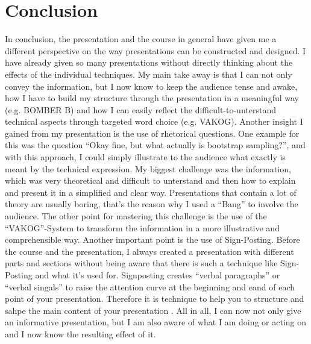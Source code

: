 \chapter{Conclusion}

In conclusion, the presentation and the course in general have given me a different perspective on the way presentations can be constructed and designed. I have already given so many presentations without directly thinking about the effects of the individual techniques. My main take away is that I can not only convey the information, but I now know to keep the audience tense and awake, how I have to build my structure through the presentation in a meaningful way (e.g. BOMBER B) and how I can easily reflect the difficult-to-unterstand technical aspects through targeted word choice (e.g. VAKOG). Another insight I gained from my presentation is the use of rhetorical questions. One example for this was the question \enquote{Okay fine, but what actually is bootstrap sampling?}, and with this approach, I could simply illustrate to the audience what exactly is meant by the technical expression. My biggest challenge was the information, which was very theoretical and difficult to unterstand and then how to explain and present it in a simplified and clear way. Presentations that contain a lot of theory are usually boring, that's the reason why I used a \enquote{Bang} to involve the audience. The other point for mastering this challenge is the use of the \enquote{VAKOG}-System to transform the information in a more illustrative and comprehensible way. Another important point is the use of Sign-Posting. Before the course and the presentation, I always created a presentation with different parts and sections without being aware that there is such a technique like Sign-Posting and what it's used for. Signposting creates \enquote{verbal paragraphs} or \enquote{verbal singals} to raise the attention curve at the beginning and eand of each point of your presentation. Therefore it is technique to help you to structure and sahpe the main content of your presentation \autocite[]{williams2008presentations}. All in all, I can now not only give an informative presentation, but I am also aware of what I am doing or acting on and I now know the resulting effect of it.